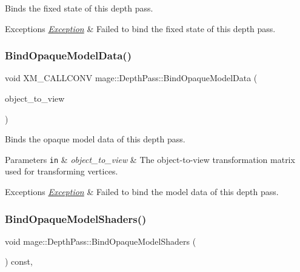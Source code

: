 Binds the fixed state of this depth pass.


\begin{DoxyExceptions}{Exceptions}
{\em \hyperlink{classmage_1_1_exception}{Exception}} & Failed to bind the fixed state of this depth pass. \\
\hline
\end{DoxyExceptions}
\hypertarget{classmage_1_1_depth_pass_a674fc5fe2e8cae4c704a554dc8bc1fdd}{}\label{classmage_1_1_depth_pass_a674fc5fe2e8cae4c704a554dc8bc1fdd} 
\subsubsection{\texorpdfstring{Bind\+Opaque\+Model\+Data()}{BindOpaqueModelData()}}
{\footnotesize\ttfamily void X\+M\+\_\+\+C\+A\+L\+L\+C\+O\+NV mage\+::\+Depth\+Pass\+::\+Bind\+Opaque\+Model\+Data (\begin{DoxyParamCaption}\item[{F\+X\+M\+M\+A\+T\+R\+IX}]{object\+\_\+to\+\_\+view }\end{DoxyParamCaption})\hspace{0.3cm}{\ttfamily [private]}}

Binds the opaque model data of this depth pass.


\begin{DoxyParams}[1]{Parameters}
\mbox{\tt in}  & {\em object\+\_\+to\+\_\+view} & The object-\/to-\/view transformation matrix used for transforming vertices. \\
\hline
\end{DoxyParams}

\begin{DoxyExceptions}{Exceptions}
{\em \hyperlink{classmage_1_1_exception}{Exception}} & Failed to bind the model data of this depth pass. \\
\hline
\end{DoxyExceptions}
\hypertarget{classmage_1_1_depth_pass_a6e10b136e64265fa36b9152353946bdc}{}\label{classmage_1_1_depth_pass_a6e10b136e64265fa36b9152353946bdc} 
\subsubsection{\texorpdfstring{Bind\+Opaque\+Model\+Shaders()}{BindOpaqueModelShaders()}}
{\footnotesize\ttfamily void mage\+::\+Depth\+Pass\+::\+Bind\+Opaque\+Model\+Shaders (\begin{DoxyParamCaption}{ }\end{DoxyParamCaption}) const\hspace{0.3cm}{\ttfamily [private]}, {\ttfamily [noexcept]}}

